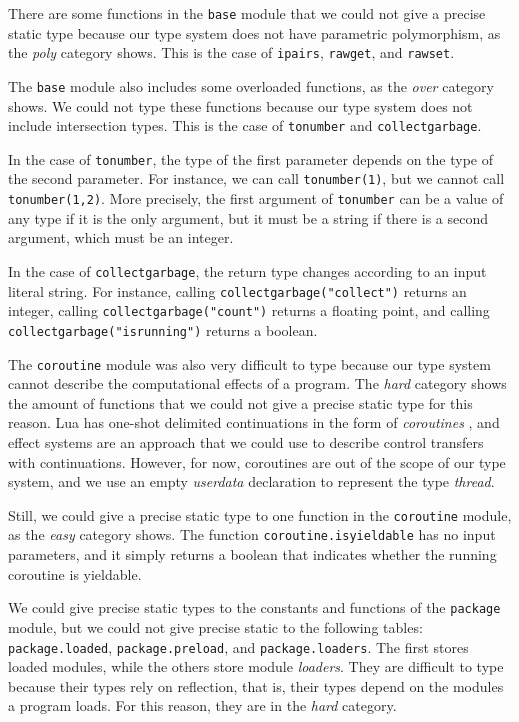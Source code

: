 There are some functions in the \texttt{base} module that
we could not give a precise static type because our type
system does not have parametric polymorphism,
as the \emph{poly} category shows.
This is the case of \texttt{ipairs}, \texttt{rawget}, and
\texttt{rawset}.

The \texttt{base} module also includes some overloaded functions,
as the \emph{over} category shows.
We could not type these functions because our type system does
not include intersection types.
This is the case of \texttt{tonumber} and \texttt{collectgarbage}.

In the case of \texttt{tonumber}, the type of the first parameter
depends on the type of the second parameter.
For instance, we can call \texttt{tonumber(1)}, but we cannot
call \texttt{tonumber(1,2)}.
More precisely, the first argument of \texttt{tonumber} can be
a value of any type if it is the only argument, but it must
be a string if there is a second argument,
which must be an integer.

In the case of \texttt{collectgarbage}, the return type changes
according to an input literal string.
For instance, calling \texttt{collectgarbage("collect")} returns an integer,
calling \texttt{collectgarbage("count")} returns a floating point,
and calling \texttt{collectgarbage("isrunning")} returns a boolean.

The \texttt{coroutine} module was also very difficult to type
because our type system cannot describe the computational effects
of a program.
The \emph{hard} category shows the amount of functions that we
could not give a precise static type for this reason.
Lua has one-shot delimited continuations \citep{james2011yield}
in the form of \emph{coroutines} \citep{moura2009rc}, and
effect systems \citep{nielson1999type} are an approach that we
could use to describe control transfers with continuations.
However, for now, coroutines are out of the scope of our type
system, and we use an empty \emph{userdata} declaration
to represent the type \emph{thread}.

Still, we could give a precise static type to one function in
the \texttt{coroutine} module, as the \emph{easy} category shows.
The function \texttt{coroutine.isyieldable} has no input parameters,
and it simply returns a boolean that indicates whether the running
coroutine is yieldable.

We could give precise static types to the constants and functions
of the \texttt{package} module, but we could not give precise static
to the following tables:
\texttt{package.loaded}, \texttt{package.preload}, and \texttt{package.loaders}.
The first stores loaded modules, while the others store module \emph{loaders}.
They are difficult to type because their types rely on reflection,
that is, their types depend on the modules a program loads.
For this reason, they are in the \emph{hard} category.

